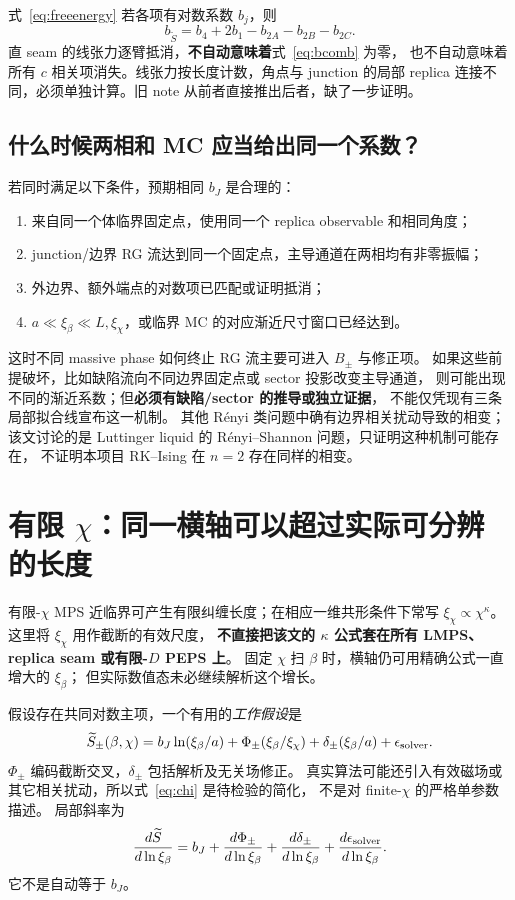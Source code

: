 \documentclass[11pt]{article}
\newcommand{\tS}{\widetilde S}
\newcommand{\xb}{\xi_\beta}
\newcommand{\xc}{\xi_\chi}
\begin{document}
式~\eqref{eq:freeenergy} 若各项有对数系数 $b_j$，则
\begin{equation}
 b_{\tS}=b_4+2b_1-b_{2A}-b_{2B}-b_{2C}.\label{eq:bcomb}
\end{equation}
直 seam 的线张力逐臂抵消，\textbf{不自动意味着}式~\eqref{eq:bcomb} 为零，
也不自动意味着所有 $c$ 相关项消失。线张力按长度计数，角点与 junction 的局部
replica 连接不同，必须单独计算。旧 note 从前者直接推出后者，缺了一步证明。

\subsection{什么时候两相和 MC 应当给出同一个系数？}
若同时满足以下条件，预期相同 $b_J$ 是合理的：
\begin{enumerate}
\item 来自同一个体临界固定点，使用同一个 replica observable 和相同角度；
\item junction/边界 RG 流达到同一个固定点，主导通道在两相均有非零振幅；
\item 外边界、额外端点的对数项已匹配或证明抵消；
\item $a\ll\xb\ll L,\xc$，或临界 MC 的对应渐近尺寸窗口已经达到。
\end{enumerate}
这时不同 massive phase 如何终止 RG 流主要可进入 $B_\pm$ 与修正项。
如果这些前提破坏，比如缺陷流向不同边界固定点或 sector 投影改变主导通道，
则可能出现不同的渐近系数；但\textbf{必须有缺陷/sector 的推导或独立证据}，
不能仅凭现有三条局部拟合线宣布这一机制。
其他 Rényi 类问题中确有边界相关扰动导致的相变\cite{SMP}；该文讨论的是
Luttinger liquid 的 Rényi--Shannon 问题，只证明这种机制可能存在，
不证明本项目 RK--Ising 在 $n=2$ 存在同样的相变。

\section{有限 $\chi$：同一横轴可以超过实际可分辨的长度}
有限-$\chi$ MPS 近临界可产生有限纠缠长度；在相应一维共形条件下常写
$\xc\propto\chi^\kappa$\cite{Pollmann}。这里将 $\xc$ 用作截断的有效尺度，
\textbf{不直接把该文的 $\kappa$ 公式套在所有 LMPS、replica seam 或有限-$D$ PEPS 上}。
固定 $\chi$ 扫 $\beta$ 时，横轴仍可用精确公式一直增大的 $\xb$；
但实际数值态未必继续解析这个增长。

假设存在共同对数主项，一个有用的\emph{工作假设}是
\begin{equation}
 \tS_\pm(\beta,\chi)
 =b_J\ln(\xb/a)+\Phi_\pm(\xb/\xc)
 +\delta_\pm(\xb/a)+\epsilon_{\rm solver}.\label{eq:chi}
\end{equation}
$\Phi_\pm$ 编码截断交叉，$\delta_\pm$ 包括解析及无关场修正。
真实算法可能还引入有效磁场或其它相关扰动，所以式~\eqref{eq:chi} 是待检验的简化，
不是对 finite-$\chi$ 的严格单参数描述。
局部斜率为
\begin{equation}
 \frac{d\tS}{d\ln\xb}
 =b_J+\frac{d\Phi_\pm}{d\ln\xb}
       +\frac{d\delta_\pm}{d\ln\xb}
       +\frac{d\epsilon_{\rm solver}}{d\ln\xb}.
\end{equation}
它不是自动等于 $b_J$。
\end{document}
